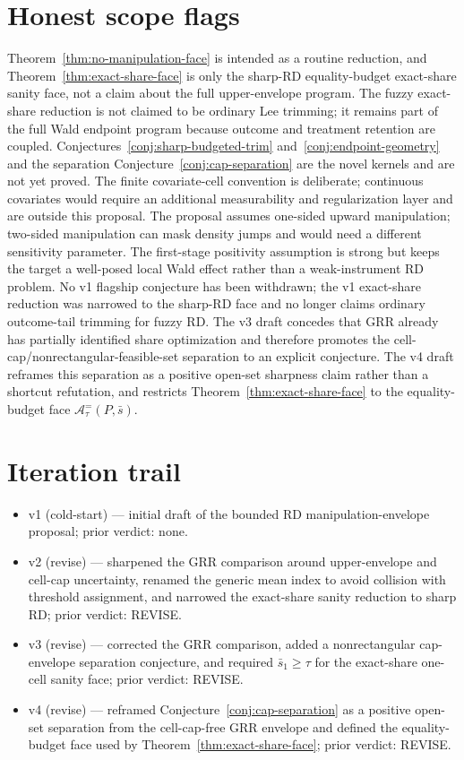 \documentclass[11pt]{article}
\theoremstyle{definition}
\theoremstyle{plain}
\theoremstyle{remark}
\begin{document}
\section{Honest scope flags}
Theorem~\ref{thm:no-manipulation-face} is intended as a routine reduction, and
Theorem~\ref{thm:exact-share-face} is only the sharp-RD equality-budget exact-share sanity
face, not a claim about the full upper-envelope program.  The fuzzy
exact-share reduction is not claimed to be ordinary Lee trimming; it remains part of the
full Wald endpoint program because outcome and treatment retention are coupled.
Conjectures~\ref{conj:sharp-budgeted-trim}
and~\ref{conj:endpoint-geometry} and the separation
Conjecture~\ref{conj:cap-separation} are the novel kernels and are not yet proved.  The finite
covariate-cell convention is deliberate; continuous covariates would require an additional
measurability and regularization layer and are outside this proposal.  The proposal assumes
one-sided upward manipulation; two-sided manipulation can mask density jumps and would need
a different sensitivity parameter.  The first-stage positivity assumption is strong but
keeps the target a well-posed local Wald effect rather than a weak-instrument RD problem.
No v1 flagship conjecture has been withdrawn; the v1 exact-share reduction was narrowed to
the sharp-RD face and no longer claims ordinary outcome-tail trimming for fuzzy RD.  The
v3 draft concedes that GRR already has partially identified share optimization and therefore
promotes the cell-cap/nonrectangular-feasible-set separation to an explicit conjecture.  The
v4 draft reframes this separation as a positive open-set sharpness claim rather than a
shortcut refutation, and restricts Theorem~\ref{thm:exact-share-face} to the equality-budget
face \(\mathcal A^{=}_\tau(P,\bar s)\).

\section{Iteration trail}
\begin{itemize}[leftmargin=*]
\item v1 (cold-start) --- initial draft of the bounded RD manipulation-envelope proposal;
prior verdict: none.
\item v2 (revise) --- sharpened the GRR comparison around upper-envelope and cell-cap
uncertainty, renamed the generic mean index to avoid collision with threshold assignment,
and narrowed the exact-share sanity reduction to sharp RD; prior verdict: REVISE.
\item v3 (revise) --- corrected the GRR comparison, added a nonrectangular cap-envelope
separation conjecture, and required \(\bar s_1\ge\tau\) for the exact-share one-cell sanity
face; prior verdict: REVISE.
\item v4 (revise) --- reframed Conjecture~\ref{conj:cap-separation} as a positive
open-set separation from the cell-cap-free GRR envelope and defined the equality-budget
face used by Theorem~\ref{thm:exact-share-face}; prior verdict: REVISE.
\end{itemize}
\end{document}
